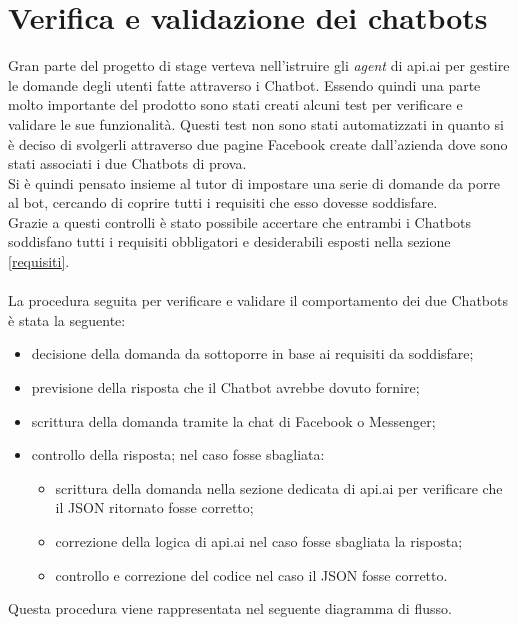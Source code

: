 \section{Verifica e validazione dei chatbots}
Gran parte del progetto di stage verteva nell'istruire gli \emph{agent} di api.ai per gestire le domande degli utenti fatte attraverso i \gls{Chatbot}. Essendo quindi una parte molto importante del prodotto sono stati creati alcuni test per verificare e validare le sue funzionalità. Questi test non sono stati automatizzati in quanto si è deciso di svolgerli attraverso due pagine Facebook create dall'azienda dove sono stati associati i due \glspl{Chatbot} di prova.\\
Si è quindi pensato insieme al tutor di impostare una serie di domande da porre al bot, cercando di coprire tutti i requisiti che esso dovesse soddisfare. \\
Grazie a questi controlli è stato possibile accertare che entrambi i \glspl{Chatbot} soddisfano tutti i requisiti obbligatori e desiderabili esposti nella sezione \ref{requisiti}.\\ \\
La procedura seguita per verificare e validare il comportamento dei due \glspl{Chatbot} è stata la seguente:
\begin{itemize}
	\item decisione della domanda da sottoporre in base ai requisiti da soddisfare;
	\item previsione della risposta che il \gls{Chatbot} avrebbe dovuto fornire;
	\item scrittura della domanda tramite la chat di Facebook o Messenger;
	\item controllo della risposta; nel caso fosse sbagliata:
	\begin{itemize}
		\item scrittura della domanda nella sezione dedicata di api.ai per verificare che il \gls{JSON} ritornato fosse corretto;
		\item correzione della logica di api.ai nel caso fosse sbagliata la risposta;
		\item controllo e correzione del codice nel caso il \gls{JSON} fosse corretto.
	\end{itemize}
\end{itemize}	 
Questa procedura viene rappresentata nel seguente diagramma di flusso.

